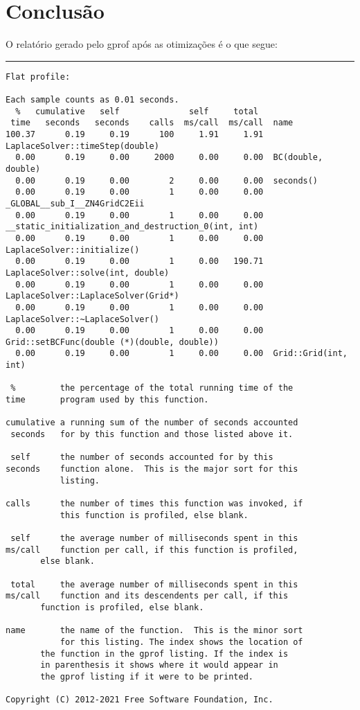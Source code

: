 \documentclass[a4paper,twosidep]{article}
\begin{document}
\section{Conclusão}
\label{sec:org3af20f2}
O relatório gerado pelo gprof após as otimizações é o que segue:

\noindent\rule{\textwidth}{0.5pt}
\begin{verbatim}
Flat profile:

Each sample counts as 0.01 seconds.
  %   cumulative   self              self     total
 time   seconds   seconds    calls  ms/call  ms/call  name
100.37      0.19     0.19      100     1.91     1.91  LaplaceSolver::timeStep(double)
  0.00      0.19     0.00     2000     0.00     0.00  BC(double, double)
  0.00      0.19     0.00        2     0.00     0.00  seconds()
  0.00      0.19     0.00        1     0.00     0.00  _GLOBAL__sub_I__ZN4GridC2Eii
  0.00      0.19     0.00        1     0.00     0.00  __static_initialization_and_destruction_0(int, int)
  0.00      0.19     0.00        1     0.00     0.00  LaplaceSolver::initialize()
  0.00      0.19     0.00        1     0.00   190.71  LaplaceSolver::solve(int, double)
  0.00      0.19     0.00        1     0.00     0.00  LaplaceSolver::LaplaceSolver(Grid*)
  0.00      0.19     0.00        1     0.00     0.00  LaplaceSolver::~LaplaceSolver()
  0.00      0.19     0.00        1     0.00     0.00  Grid::setBCFunc(double (*)(double, double))
  0.00      0.19     0.00        1     0.00     0.00  Grid::Grid(int, int)

 %         the percentage of the total running time of the
time       program used by this function.

cumulative a running sum of the number of seconds accounted
 seconds   for by this function and those listed above it.

 self      the number of seconds accounted for by this
seconds    function alone.  This is the major sort for this
           listing.

calls      the number of times this function was invoked, if
           this function is profiled, else blank.

 self      the average number of milliseconds spent in this
ms/call    function per call, if this function is profiled,
	   else blank.

 total     the average number of milliseconds spent in this
ms/call    function and its descendents per call, if this
	   function is profiled, else blank.

name       the name of the function.  This is the minor sort
           for this listing. The index shows the location of
	   the function in the gprof listing. If the index is
	   in parenthesis it shows where it would appear in
	   the gprof listing if it were to be printed.

Copyright (C) 2012-2021 Free Software Foundation, Inc.


\end{verbatim}
\end{document}
